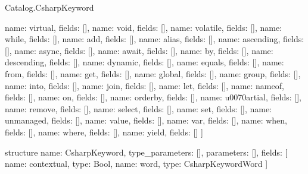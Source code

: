 \begin{lexlean}{Catalog.CsharpKeyword}
\begin{semanticmodule}
{    {name: virtual, fields: []},
    {name: void, fields: []},
    {name: volatile, fields: []},
    {name: while, fields: []},
    {name: add, fields: []},
    {name: alias, fields: []},
    {name: ascending, fields: []},
    {name: async, fields: []},
    {name: await, fields: []},
    {name: by, fields: []},
    {name: descending, fields: []},
    {name: dynamic, fields: []},
    {name: equals, fields: []},
    {name: from, fields: []},
    {name: get, fields: []},
    {name: global, fields: []},
    {name: group, fields: []},
    {name: into, fields: []},
    {name: join, fields: []},
    {name: let, fields: []},
    {name: nameof, fields: []},
    {name: on, fields: []},
    {name: orderby, fields: []},
    {name: u0070artial, fields: []},
    {name: remove, fields: []},
    {name: select, fields: []},
    {name: set, fields: []},
    {name: unmanaged, fields: []},
    {name: value, fields: []},
    {name: var, fields: []},
    {name: when, fields: []},
    {name: where, fields: []},
    {name: yield, fields: []}
  ]
}

structure{
  name: CsharpKeyword,
  type_parameters: [],
  parameters: [],
  fields: [
    {name: contextual, type: Bool},
    {name: word, type: CsharpKeywordWord}
  ]
}
\end{semanticmodule}
\end{lexlean}

